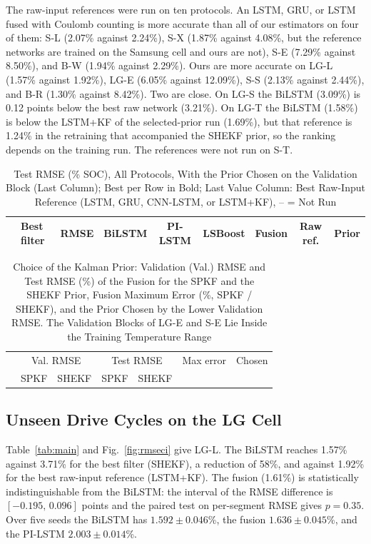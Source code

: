 \documentclass[journal]{IEEEtran}
\begin{document}
The raw-input references were run on ten protocols. An LSTM, GRU, or LSTM fused with Coulomb counting is more accurate than all of our estimators on four of them: S-L (2.07\% against 2.24\%), S-X (1.87\% against 4.08\%, but the reference networks are trained on the Samsung cell and ours are not), S-E (7.29\% against 8.50\%), and B-W (1.94\% against 2.29\%). Ours are more accurate on LG-L (1.57\% against 1.92\%), LG-E (6.05\% against 12.09\%), S-S (2.13\% against 2.44\%), and B-R (1.30\% against 8.42\%). Two are close. On LG-S the BiLSTM (3.09\%) is 0.12 points below the best raw network (3.21\%). On LG-T the BiLSTM (1.58\%) is below the LSTM+KF of the selected-prior run (1.69\%), but that reference is 1.24\% in the retraining that accompanied the SHEKF prior, so the ranking depends on the training run. The references were not run on S-T.

\begin{table}[!t]
\caption{Test RMSE (\% SOC), All Protocols, With the Prior Chosen on the Validation Block (Last Column); Best per Row in Bold; Last Value Column: Best Raw-Input Reference (LSTM, GRU, CNN-LSTM, or LSTM+KF), -- = Not Run}
\label{tab:headline}
\centering\footnotesize
\setlength{\tabcolsep}{5pt}
\begin{tabular}{@{}llccccccc@{}}
\toprule
 & Best filter & RMSE & BiLSTM & PI-LSTM & LSBoost & Fusion & Raw ref. & Prior\\
\midrule

\end{tabular}
\end{table}

\begin{table}[!t]
\caption{Choice of the Kalman Prior: Validation (Val.) RMSE and Test RMSE (\%) of the Fusion for the SPKF and the SHEKF Prior, Fusion Maximum Error (\%, SPKF / SHEKF), and the Prior Chosen by the Lower Validation RMSE. The Validation Blocks of LG-E and S-E Lie Inside the Training Temperature Range}
\label{tab:prior}
\centering\scriptsize
\setlength{\tabcolsep}{2.6pt}
\begin{tabular}{@{}lcccccc@{}}
\toprule
 & \multicolumn{2}{c}{Val. RMSE} & \multicolumn{2}{c}{Test RMSE} & Max error & Chosen\\
 & SPKF & SHEKF & SPKF & SHEKF & & \\
\midrule

\end{tabular}
\end{table}

\subsection{Unseen Drive Cycles on the LG Cell}
Table~\ref{tab:main} and Fig.~\ref{fig:rmseci} give LG-L. The BiLSTM reaches 1.57\% against 3.71\% for the best filter (SHEKF), a reduction of 58\%, and against 1.92\% for the best raw-input reference (LSTM+KF). The fusion (1.61\%) is statistically indistinguishable from the BiLSTM: the interval of the RMSE difference is $[-0.195,\,0.096]$ points and the paired test on per-segment RMSE gives $p=0.35$. Over five seeds the BiLSTM has $1.592\pm0.046$\%, the fusion $1.636\pm0.045$\%, and the PI-LSTM $2.003\pm0.014$\%.
\end{document}
